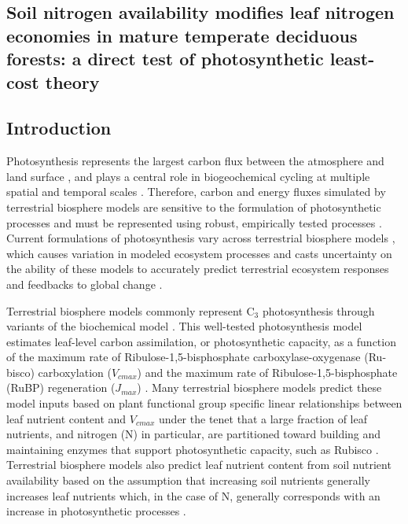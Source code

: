 \begin{singlespace}
    \chapter{\textbf{Soil nitrogen availability modifies leaf nitrogen economies in mature temperate deciduous forests: a direct test of photosynthetic least-cost theory}}
    \end{singlespace}
    
    \section{Introduction}

    Photosynthesis represents the largest carbon flux between the atmosphere and land surface , and plays a central role in biogeochemical cycling at multiple spatial and temporal scales . Therefore, carbon and energy fluxes simulated by terrestrial biosphere models are sensitive to the formulation of photosynthetic processes  and must be represented using robust, empirically tested processes . Current formulations of photosynthesis vary across terrestrial biosphere models , which causes variation in modeled ecosystem processes  and casts uncertainty on the ability of these models to accurately predict terrestrial ecosystem responses and feedbacks to global change .

    Terrestrial biosphere models commonly represent C$_{3}$ photosynthesis through variants of the  biochemical model . This well-tested photosynthesis model estimates leaf-level carbon assimilation, or photosynthetic capacity, as a function of the maximum rate of Ribulose-1,5-bisphosphate carboxylase-oxygenase (Ru-bisco) carboxylation ($V_{cmax}$) and the maximum rate of Ribulose-1,5-bisphosphate (RuBP) regeneration ($J_{max}$) . Many terrestrial biosphere models predict these model inputs based on plant functional group specific linear relationships between leaf nutrient content and $V_{cmax}$  under the tenet that a large fraction of leaf nutrients, and nitrogen (N) in particular, are partitioned toward building and maintaining enzymes that support photosynthetic capacity, such as Rubisco . Terrestrial biosphere models also predict leaf nutrient content from soil nutrient availability based on the assumption that increasing soil nutrients generally increases leaf nutrients  which, in the case of N, generally corresponds with an increase in photosynthetic processes .

